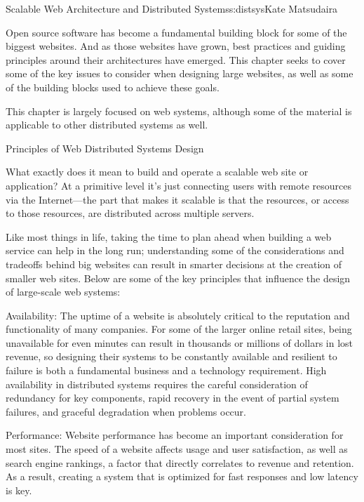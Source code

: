 \begin{aosachapter}{Scalable Web Architecture and Distributed Systems}{s:distsys}{Kate Matsudaira}

Open source software has become a fundamental building block for some
of the biggest websites. And as those websites have grown,
best practices and guiding principles around their architectures have
emerged. This chapter seeks to cover some of the key issues to
consider when designing large websites, as well as some of the
building blocks used to achieve these goals.

This chapter is largely focused on web systems, although some of the
material is applicable to other distributed systems as well.

\begin{aosasect1}{Principles of Web Distributed Systems Design}

What exactly does it mean to build and operate a scalable web site or
application? At a primitive level it's just connecting users with remote
resources via the Internet---the part that makes it scalable is
that the resources, or access to those resources, are distributed
across multiple servers.

Like most things in life, taking the time to plan ahead when building a
web service can help in
the long run; 
understanding some of the considerations and tradeoffs behind big
websites can result in smarter decisions at the creation of
smaller web sites. Below are some of the key principles that influence
the design of large-scale web systems:

\begin{aosadescription}

\item{Availability:} The uptime of a website is absolutely critical to
  the reputation and functionality of many companies. For some of the
  larger online retail sites, being unavailable for even minutes can
  result in thousands or millions of dollars in lost revenue, so
  designing their systems to be constantly available and resilient to
  failure is both a fundamental business and a technology
  requirement. High availability in distributed systems requires the
  careful consideration of redundancy for key components, rapid
  recovery in the event of partial system failures, and graceful
  degradation when problems occur.

\item{Performance:} Website performance has become an important
  consideration for most sites. The speed of a website affects
  usage and user satisfaction, as well as search engine rankings, a
  factor that directly correlates to revenue and retention. As a
  result, creating a system that is optimized for fast responses and
  low latency is key.


\end{aosadescription}
\end{aosasect1}
\end{aosachapter}
